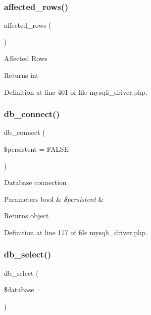 \subsubsection{\texorpdfstring{affected\_rows()}{affected\_rows()}}
{\footnotesize\ttfamily affected\+\_\+rows (\begin{DoxyParamCaption}{ }\end{DoxyParamCaption})}

Affected Rows

\begin{DoxyReturn}{Returns}
int 
\end{DoxyReturn}


Definition at line 401 of file mysqli\+\_\+driver.\+php.

\mbox{\label{class_c_i___d_b__mysqli__driver_a52bf595e79e96cc0a7c907a9b45aeb4d}} 
\subsubsection{\texorpdfstring{db\_connect()}{db\_connect()}}
{\footnotesize\ttfamily db\+\_\+connect (\begin{DoxyParamCaption}\item[{}]{\$persistent = {\ttfamily FALSE} }\end{DoxyParamCaption})}

Database connection


\begin{DoxyParams}[1]{Parameters}
bool & {\em \$persistent} & \\
\hline
\end{DoxyParams}
\begin{DoxyReturn}{Returns}
object 
\end{DoxyReturn}


Definition at line 117 of file mysqli\+\_\+driver.\+php.

\mbox{\label{class_c_i___d_b__mysqli__driver_a18ae9c21870b30b45337c5e3626190cc}} 
\subsubsection{\texorpdfstring{db\_select()}{db\_select()}}
{\footnotesize\ttfamily db\+\_\+select (\begin{DoxyParamCaption}\item[{}]{\$database = {\ttfamily \textquotesingle{}\textquotesingle{}} }\end{DoxyParamCaption})}

